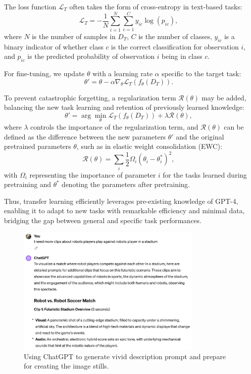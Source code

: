 \documentclass[11pt,a4paper,oneside]{report}
\begin{document}
The loss function \(\mathcal{L}_{T}\) often takes the form of cross-entropy in text-based tasks:
\[
\mathcal{L}_{T} = -\frac{1}{N}\sum_{i=1}^{N}\sum_{c=1}^{C} y_{ic}\log(p_{ic}),
\]
where \(N\) is the number of samples in \(D_{T}\), \(C\) is the number of classes, \(y_{ic}\) is a binary indicator of whether class \(c\) is the correct classification for observation \(i\), and \(p_{ic}\) is the predicted probability of observation \(i\) being in class \(c\).

For fine-tuning, we update \(\theta\) with a learning rate \(\alpha\) specific to the target task:
\[
\theta' = \theta - \alpha \nabla_{\theta} \mathcal{L}_{T}(f_{\theta}(D_{T})).
\]

To prevent catastrophic forgetting, a regularization term \(\mathcal{R}(\theta)\) may be added, balancing the new task learning and retention of previously learned knowledge:
\[
\theta' = \arg\min_{\theta} \mathcal{L}_{T}(f_{\theta}(D_{T})) + \lambda \mathcal{R}(\theta),
\]
where \(\lambda\) controls the importance of the regularization term, and \(\mathcal{R}(\theta)\) can be defined as the difference between the new parameters \(\theta'\) and the original pretrained parameters \(\theta\), such as in elastic weight consolidation (EWC):
\[
\mathcal{R}(\theta) = \sum_{i} \frac{1}{2} \Omega_{i} (\theta_{i} - \theta_{i}^{*})^2,
\]
with \(\Omega_{i}\) representing the importance of parameter \(i\) for the tasks learned during pretraining and \(\theta^{*}\) denoting the parameters after pretraining.

Thus, transfer learning efficiently leverages pre-existing knowledge of GPT-4, enabling it to adapt to new tasks with remarkable efficiency and minimal data, bridging the gap between general and specific task performances.

\begin{figure}[htbp]
  \centering
  \includegraphics[width=0.8\textwidth]{ChatGPT.png}
  \caption{Using ChatGPT to generate vivid description prompt and prepare for creating the image stills.}
\end{figure}
\end{document}

